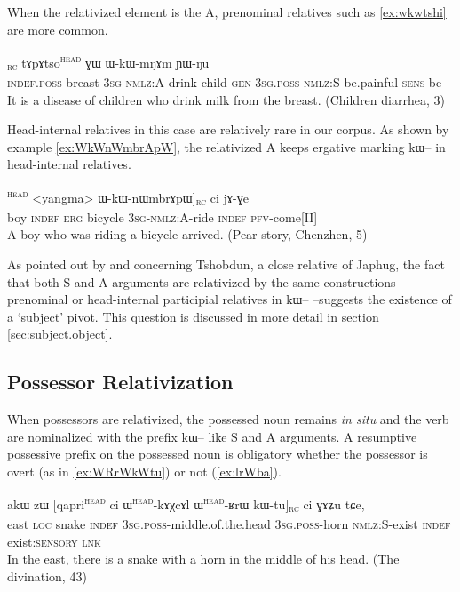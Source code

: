 \documentclass[oldfontcommands,oneside,a4paper,11pt]{article}
\newcommand{\ipa}[1]{{\phon #1}} %
\newcommand{\tete}{\textsuperscript{\textsc{head}}}
\newcommand{\rc}{\textsubscript{\textsc{rc}}}
\begin{document}
When the relativized element is the A, prenominal relatives such as \ref{ex:wkwtshi} are more common.

\begin{exe}
   \ex  \label{ex:wkwtshi}
\gll [\ipa{tɯ-nɯ}  	\ipa{ɯ-kɯ-tsʰi}]\rc{}  	\ipa{tɤpɤtso}\tete{}  	\ipa{ɣɯ}  	\ipa{ɯ-kɯ-mŋɤm}  	\ipa{ɲɯ-ŋu}  \\
\textsc{indef.poss}-breast \textsc{3sg-nmlz:A}-drink child \textsc{gen} \textsc{3sg.poss-nmlz:S}-be.painful \textsc{sens}-be \\
\glt It is a disease of children who drink milk from the breast. (Children diarrhea, 3)
\end{exe}


Head-internal relatives in this case are relatively rare in our corpus. As shown by example  \ref{ex:WkWnWmbrApW}, the relativized A keeps ergative marking \ipa{kɯ--} in head-internal relatives.

\begin{exe}
   \ex  \label{ex:WkWnWmbrApW}
\gll [[\ipa{tɤpɤtso}  	\ipa{ci}  	\ipa{kɯ}]\tete{}  	<yangma> 	\ipa{ɯ-kɯ-nɯmbrɤpɯ}]\rc{}  	\ipa{ci}  	\ipa{jɤ-ɣe}  \\
boy \textsc{indef} \textsc{erg} bicycle \textsc{3sg-nmlz:A}-ride \textsc{indef} \textsc{pfv}-come[II] \\
\glt A boy who was riding a bicycle arrived. (Pear story, Chenzhen, 5)
\end{exe}


As pointed out by \citet{jackson03caodeng} and \citet{jackson06guanxiju} concerning Tshobdun, a close relative of Japhug, the fact that both S and A arguments are relativized by the same constructions -- prenominal or head-internal participial relatives in \ipa{kɯ--} --suggests  the existence of a `subject' pivot. This question is discussed in more detail in section \ref{sec:subject.object}.


\subsection{Possessor Relativization}

When possessors are relativized, the possessed noun remains \textit{in situ} and the verb are nominalized with the prefix \ipa{kɯ}-- like S and A arguments. A resumptive possessive prefix on the possessed noun is obligatory whether the possessor is overt (as in \ref{ex:WRrWkWtu}) or not (\ref{ex:lrWba}).

      \begin{exe}
   \ex \label{ex:WRrWkWtu}
 \gll 
\ipa{akɯ}   	\ipa{zɯ}   	[\ipa{qapri}\tete{}   	\ipa{ci}   	\ipa{ɯ}\tete{}-\ipa{kɤχcɤl}  	\ipa{ɯ}\tete{}-\ipa{ʁrɯ}   	\ipa{kɯ-tu}]\rc{}   	\ipa{ci}   	\ipa{ɣɤʑu}   	\ipa{tɕe,}   \\
east \textsc{loc} snake \textsc{indef} \textsc{3sg.poss}-middle.of.the.head  \textsc{3sg.poss}-horn \textsc{nmlz:S}-exist \textsc{indef} exist:\textsc{sensory}  \textsc{lnk} \\
\glt In the east, there is a snake with a horn in the middle of his head.  (The divination, 43)
\end{exe}
 
\end{document}
